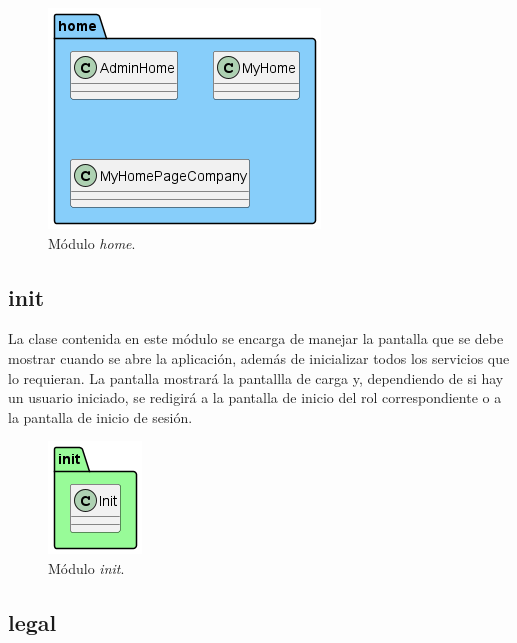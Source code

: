 \documentclass[a4paper, 12pt]{article}
\begin{document}
\begin{figure}[H]
	\begin{center}
		{\includegraphics[width=0.8\linewidth]{diagram/Home.png}\par}
		\caption{Módulo  \textit{home}.}
	\end{center}
\end{figure}


\subsection*{init}

La clase contenida en este módulo se encarga de manejar la pantalla que se debe mostrar cuando se abre la aplicación, además de inicializar todos los servicios que lo requieran. La pantalla mostrará la pantallla de carga y, dependiendo de si hay un usuario iniciado, se redigirá a la pantalla de inicio del rol correspondiente o a la pantalla de inicio de sesión.

\begin{figure}[H]
	\begin{center}
		{\includegraphics[]{diagram/Init.png}\par}
		\caption{Módulo  \textit{init}.}
	\end{center}
\end{figure}


\subsection*{legal}
\end{document}

